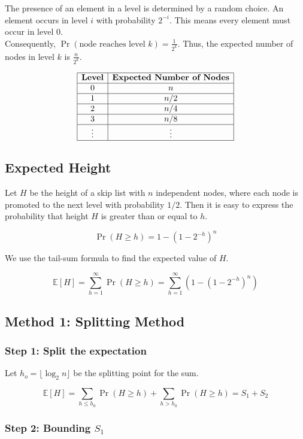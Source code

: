 The presence of an element in a level is determined by a random choice. An element occurs 
in level $i$ with probability $2^{-i}$. This means every element must occur in level 0.\\


\noindent Consequently, $\Pr(\text{node reaches level }k)=\frac1{2^k}$. Thus, the expected 
number of nodes in level \(k\) is $\frac{n}{2^k}$.

\[
\begin{array}{|c|c|}
\hline
\textbf{Level} & \textbf{Expected Number of Nodes} \\
\hline
0 & n \\
\hline
1 & n/2\\
\hline
2 & n/4 \\
\hline
3 & n/8 \\
\hline
\vdots & \vdots \\
\hline
\end{array}
\]

\subsection{Expected Height}

Let \(H\) be the height of a skip list with \(n\) independent nodes, where each node is 
promoted to the next level with probability \(1/2\). Then it is easy to express the probability that 
height $H$ is greater than or equal to $h$.

\[
\Pr(H\ge h)=1-(1-2^{-h})^n
\]

We use the tail-sum formula to find the expected value of \(H\).

\[
\mathbb{E}[H]=\sum_{h=1}^{\infty}\Pr(H\ge h)
=\sum_{h=1}^{\infty}\left(1-(1-2^{-h})^n\right)
\]


\subsection*{Method 1: Splitting Method}

\subsubsection*{Step 1: Split the expectation}


Let $h_o=\lfloor \log_2 n \rfloor$ be the splitting point for the sum.

\[
\mathbb{E}[H]
=\sum_{h\le h_0}\Pr(H\ge h)
+\sum_{h>h_0}\Pr(H\ge h)
=S_1+S_2
\]


\subsubsection*{Step 2: Bounding \(S_1\)}

